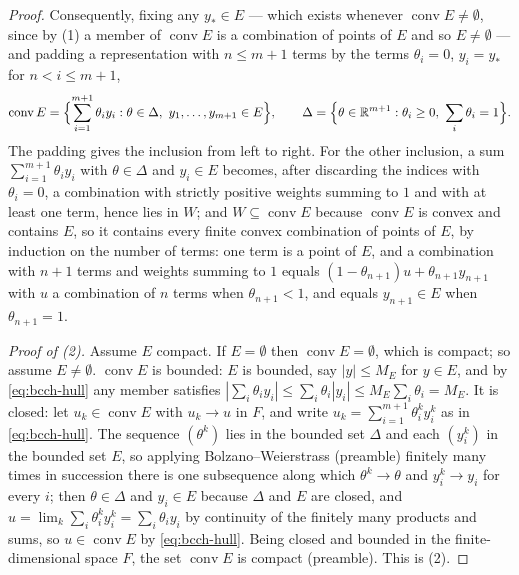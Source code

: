 \begin{proof}
Consequently, fixing any $y_\ast\in E$ — which exists whenever
$\operatorname{conv}E\ne\emptyset$, since by (1) a member of
$\operatorname{conv}E$ is a combination of points of $E$ and so $E\ne\emptyset$ —
and padding a representation with $n\le m+1$ terms by the terms $\theta_i=0$,
$y_i=y_\ast$ for $n<i\le m+1$,
\begin{equation}\label{eq:bcch-hull}
  \operatorname{conv}E=\Bigl\{\sum_{i=1}^{m+1}\theta_iy_i:
     \theta\in\Delta,\ y_1,\dots,y_{m+1}\in E\Bigr\},
  \qquad
  \Delta=\Bigl\{\theta\in\R^{m+1}:\theta_i\ge0,\ \sum_i\theta_i=1\Bigr\}.
\end{equation}
The padding gives the inclusion from left to right. For the other inclusion, a
sum $\sum_{i=1}^{m+1}\theta_iy_i$ with $\theta\in\Delta$ and $y_i\in E$ becomes,
after discarding the indices with $\theta_i=0$, a combination with strictly
positive weights summing to $1$ and with at least one term, hence lies in
$W$; and $W\subseteq\operatorname{conv}E$ because $\operatorname{conv}E$ is convex
and contains $E$, so it contains every finite convex combination of points of
$E$, by induction on the number of terms: one term is a point of $E$, and a
combination with $n+1$ terms and weights summing to $1$ equals
$(1-\theta_{n+1})u+\theta_{n+1}y_{n+1}$ with $u$ a combination of $n$ terms when
$\theta_{n+1}<1$, and equals $y_{n+1}\in E$ when $\theta_{n+1}=1$.

\emph{Proof of (2).} Assume $E$ compact. If $E=\emptyset$ then
$\operatorname{conv}E=\emptyset$, which is compact; so assume $E\ne\emptyset$.
$\operatorname{conv}E$ is bounded: $E$ is bounded, say $|y|\le M_E$ for $y\in E$,
and by \eqref{eq:bcch-hull} any member satisfies
$|\sum_i\theta_iy_i|\le\sum_i\theta_i|y_i|\le M_E\sum_i\theta_i=M_E$. It is
closed: let $u_k\in\operatorname{conv}E$ with $u_k\to u$ in $F$, and write
$u_k=\sum_{i=1}^{m+1}\theta^k_iy^k_i$ as in \eqref{eq:bcch-hull}. The sequence
$(\theta^k)$ lies in the bounded set $\Delta$ and each $(y^k_i)$ in the bounded
set $E$, so applying Bolzano--Weierstrass (preamble) finitely many times in
succession there is one subsequence along which $\theta^k\to\theta$ and
$y^k_i\to y_i$ for every $i$; then $\theta\in\Delta$ and $y_i\in E$ because
$\Delta$ and $E$ are closed, and
$u=\lim_k\sum_i\theta^k_iy^k_i=\sum_i\theta_iy_i$ by continuity of the finitely
many products and sums, so $u\in\operatorname{conv}E$ by
\eqref{eq:bcch-hull}. Being closed and bounded in the finite-dimensional space
$F$, the set $\operatorname{conv}E$ is compact (preamble). This is (2).
\end{proof}
